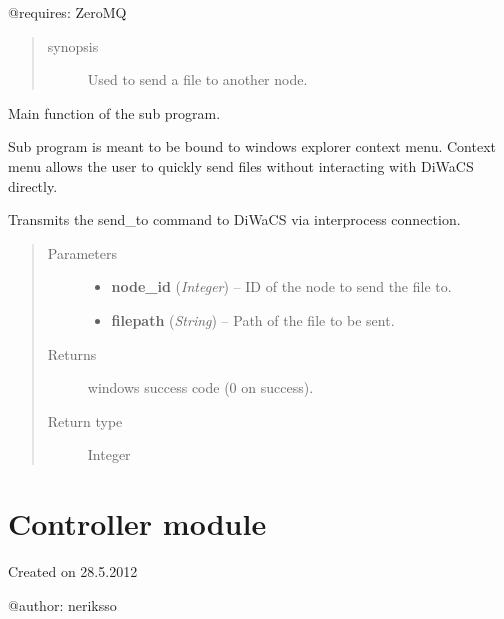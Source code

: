 \documentclass[letterpaper,10pt,english]{sphinxmanual}
\begin{document}
@requires: ZeroMQ
\begin{quote}\begin{description}
\item[{synopsis}] \leavevmode
Used to send a file to another node.

\end{description}\end{quote}

\begin{fulllineitems}
\label{api:send_file_to.main}
Main function of the sub program.

Sub program is meant to be bound to windows explorer context menu.
Context menu allows the user to quickly send files without interacting
with DiWaCS directly.

Transmits the send\_to command to DiWaCS via interprocess connection.
\begin{quote}\begin{description}
\item[{Parameters}] \leavevmode\begin{itemize}
\item {} 
\textbf{node\_id} (\emph{Integer}) -- ID of the node to send the file to.

\item {} 
\textbf{filepath} (\emph{String}) -- Path of the file to be sent.

\end{itemize}

\item[{Returns}] \leavevmode
windows success code (0 on success).

\item[{Return type}] \leavevmode
Integer

\end{description}\end{quote}

\end{fulllineitems}



\section{Controller module}
\label{api:module-controller}\label{api:controller-module}
Created on 28.5.2012

@author: neriksso
\end{document}
